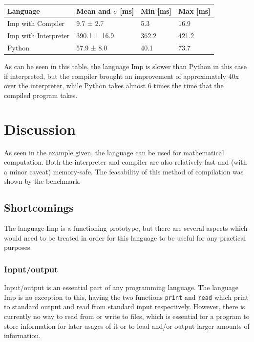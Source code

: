 \documentclass[12pt]{article}
\begin{document}
\begin{table}[H]
	\centering
	\begin{tabular}{|l|l|l|l|}
		\hline
		Language             & Mean and $\sigma$ [ms] & Min [ms] & Max [ms] \\ \hline
		Imp with Compiler    & 9.7 ± 2.7              & 5.3      & 16.9     \\ \hline
		Imp with Interpreter & 390.1 ± 16.9           & 362.2    & 421.2    \\ \hline
		Python               & 57.9 ± 8.0             & 40.1     & 73.7     \\ \hline
	\end{tabular}
\end{table}

As can be seen in this table, the language Imp is slower than Python in this case if interpreted,
but the compiler brought an improvement of approximately 40x over the interpreter, while Python
takes almost 6 times the time that the compiled program takes.

\section{Discussion}
As seen in the example given, the language
can be used for mathematical computation.
Both the interpreter and compiler are also relatively fast and
(with a minor caveat) memory-safe. The feasability of this method of
compilation was shown by the benchmark.

\subsection{Shortcomings}\label{shortcomings}
The language Imp is a functioning prototype, but there are several
aspects which would need to be treated in order for this language
to be useful for any practical purposes.

\subsubsection{Input/output}
Input/output is an essential part of any programming language.
The language Imp is no exception to this, having the two functions
\texttt{print} and \texttt{read} which print to standard output and read from
standard input respectively. However, there is currently no way
to read from or write to files, which is essential for a program
to store information for later usages of it or to load and/or output larger
amounts of information.
\end{document}
